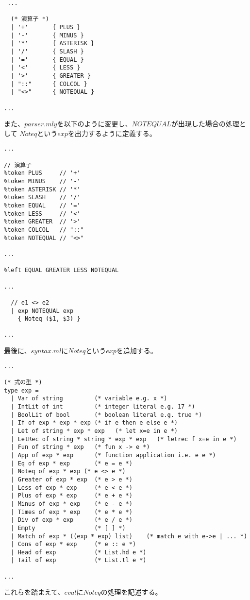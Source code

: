 \documentclass[a4paper,9pt]{jsarticle}
\begin{document}
\begin{lstlisting}
 ...

  (* 演算子 *)
  | '+'       { PLUS }
  | '-'       { MINUS }
  | '*'       { ASTERISK }
  | '/'       { SLASH }
  | '='       { EQUAL }
  | '<'       { LESS }
  | '>'       { GREATER }
  | "::"      { COLCOL }
  | "<>"      { NOTEQUAL }

...
\end{lstlisting}
また、$parser.mly$を以下のように変更し、$NOTEQUAL$が出現した場合の処理として
$Noteq$という$exp$を出力するように定義する。
\begin{lstlisting}
...

// 演算子
%token PLUS     // '+'
%token MINUS    // '-'
%token ASTERISK // '*'
%token SLASH    // '/'
%token EQUAL    // '='
%token LESS     // '<'
%token GREATER  // '>'
%token COLCOL   // "::"
%token NOTEQUAL // "<>"

...

%left EQUAL GREATER LESS NOTEQUAL

...

  // e1 <> e2
  | exp NOTEQUAL exp
    { Noteq ($1, $3) }
    
...
\end{lstlisting}
最後に、$syntax.ml$に$Noteq$という$exp$を追加する。
\begin{lstlisting}
...

(* 式の型 *)
type exp = 
  | Var of string         (* variable e.g. x *)
  | IntLit of int         (* integer literal e.g. 17 *)
  | BoolLit of bool       (* boolean literal e.g. true *)
  | If of exp * exp * exp (* if e then e else e *)
  | Let of string * exp * exp   (* let x=e in e *)
  | LetRec of string * string * exp * exp   (* letrec f x=e in e *)
  | Fun of string * exp   (* fun x -> e *)
  | App of exp * exp      (* function application i.e. e e *)
  | Eq of exp * exp       (* e = e *)
  | Noteq of exp * exp (* e <> e *)
  | Greater of exp * exp  (* e > e *)
  | Less of exp * exp     (* e < e *)
  | Plus of exp * exp     (* e + e *)
  | Minus of exp * exp    (* e - e *)
  | Times of exp * exp    (* e * e *)
  | Div of exp * exp      (* e / e *)
  | Empty                 (* [ ] *)
  | Match of exp * ((exp * exp) list)    (* match e with e->e | ... *)
  | Cons of exp * exp     (* e :: e *)
  | Head of exp           (* List.hd e *)
  | Tail of exp           (* List.tl e *)

...
\end{lstlisting}

これらを踏まえて、$eval$に$Noteq$の処理を記述する。
\end{document}
